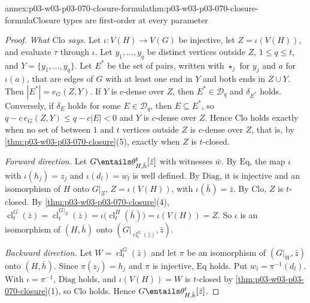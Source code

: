 \begin{annexitem}{annex:p03-w03-p03-070-closure-formula}{thm:p03-w03-p03-070-closure-formula}{Closure types are first-order at every parameter}
\begin{proof}
\emph{What \(\mathrm{Clo}\) says.}  Let \(\iota:V(H)\to V(G)\) be injective,
let \(Z=\iota(V(H))\), and evaluate \(\tau\) through \(\iota\).  Let
\(y_1,\ldots,y_q\) be distinct vertices outside \(Z\), \(1\leq q\leq t\), and
\(Y=\{y_1,\ldots,y_q\}\).  Let \(E^\ast\) be the set of pairs, written with
\(\star_j\) for \(y_j\) and \(a\) for \(\iota(a)\), that are edges of \(G\)
with at least one end in \(Y\) and both ends in \(Z\cup Y\).  Then
\(|E^\ast|=e_G(Z,Y)\).  If \(Y\) is \(c\)-dense over \(Z\), then
\(E^\ast\in\mathcal D_q\) and \(\delta_{E^\ast}\) holds.  Conversely, if
\(\delta_E\) holds for some \(E\in\mathcal D_q\), then
\(E\subseteq E^\ast\), so \(q-c\,e_G(Z,Y)\leq q-c|E|<0\) and \(Y\) is
\(c\)-dense over \(Z\).  Hence \(\mathrm{Clo}\) holds exactly when no set of
between \(1\) and \(t\) vertices outside \(Z\) is \(c\)-dense over \(Z\),
that is, by \cref{thm:p03-w03-p03-070-closure}(5), exactly when \(Z\) is
\(t\)-closed.

\emph{Forward direction.}  Let \(G\entails\theta^t_{H,\bar h}[\bar z]\) with
witnesses \(\bar w\).  By \(\mathrm{Eq}\), the map \(\iota\) with
\(\iota(h_j)=z_j\) and \(\iota(d_l)=w_l\) is well defined.  By
\(\mathrm{Diag}\), it is injective and an isomorphism of \(H\) onto
\(G|_Z\), \(Z=\iota(V(H))\), with \(\iota(\bar h)=\bar z\).  By
\(\mathrm{Clo}\), \(Z\) is \(t\)-closed.  By
\cref{thm:p03-w03-p03-070-closure}(4),
\(\operatorname{cl}^G_t(\bar z)=\operatorname{cl}^{G|_Z}_t(\bar z)
=\iota\bigl(\operatorname{cl}^H_t(\bar h)\bigr)=\iota(V(H))=Z\).  So
\(\iota\) is an isomorphism of \((H,\bar h)\) onto
\((G|_{\operatorname{cl}^G_t(\bar z)},\bar z)\).

\emph{Backward direction.}  Let \(W=\operatorname{cl}^G_t(\bar z)\) and let
\(\pi\) be an isomorphism of \((G|_W,\bar z)\) onto \((H,\bar h)\).  Since
\(\pi(z_j)=h_j\) and \(\pi\) is injective, \(\mathrm{Eq}\) holds.  Put
\(w_l=\pi^{-1}(d_l)\).  With \(\iota=\pi^{-1}\), \(\mathrm{Diag}\) holds, and
\(\iota(V(H))=W\) is \(t\)-closed by \cref{thm:p03-w03-p03-070-closure}(1),
so \(\mathrm{Clo}\) holds.  Hence \(G\entails\theta^t_{H,\bar h}[\bar z]\).
\end{proof}
\end{annexitem}

